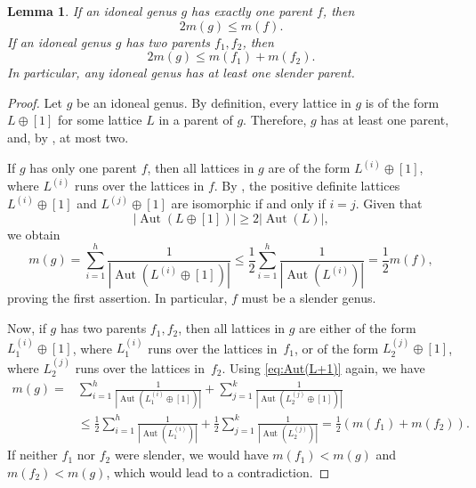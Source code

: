 \documentclass[a4paper]{amsart}
\theoremstyle{definition}
\theoremstyle{plain}
\newtheorem{lemma}[definition]{Lemma}
\DeclareMathOperator{\Aut}{Aut}
\begin{document}
\begin{lemma} \label{lem:slender.parent}
	If an idoneal genus \(g\) has exactly one parent \(f\), then
	\[
		2 m(g) \leq m(f).
	\]
	If an idoneal genus \(g\) has two parents \(f_1,f_2\), then
	\[
		2 m(g) \leq m(f_1) + m(f_2).
	\]	
	In particular, any idoneal genus has at least one slender parent.
\end{lemma}
\begin{proof}
    Let \(g\) be an idoneal genus. By definition, every lattice in \(g\) is of the form \(L \oplus [1]\) for some lattice \(L\) in a parent of \(g\). Therefore, \(g\) has at least one parent, and, by , at most two.
    
    If \(g\) has only one parent \(f\), then all lattices in \(g\) are of the form \(L^{(i)} \oplus [1]\), where \(L^{(i)}\) runs over the lattices in \(f\). 
    By \cite[Satz~27.5]{kneser}, the positive definite lattices \(L^{(i)} \oplus [1]\) and \(L^{(j)} \oplus [1]\) are isomorphic if and only if \(i = j\). 
    Given that
    \begin{equation} \label{eq:Aut(L+1)}
    	|{\Aut(L \oplus [1])}| \geq 2 |{\Aut(L)}|,
    \end{equation}
    we obtain
    \[
        m(g) = \sum_{i = 1}^h \frac{1}{|{\Aut(L^{(i)} \oplus [1])}|} \leq \frac 12 \sum_{i = 1}^h \frac{1}{|{\Aut(L^{(i)})}|} = \frac 12 m(f),
    \]
    proving the first assertion. In particular, \(f\) must be a slender genus.
    
    Now, if \(g\) has two parents \(f_1,f_2\), then all lattices in \(g\) are either of the form \(L_1^{(i)} \oplus [1]\), where \(L_1^{(i)}\) runs over the lattices in~\(f_1\), or of the form \(L_2^{(j)} \oplus [1]\), where \(L_2^{(j)}\) runs over the lattices in~\(f_2\).
    Using \eqref{eq:Aut(L+1)} again, we have
    \begin{align*}
        m(g) = & \sum_{i = 1}^h \frac{1}{|{\Aut(L_1^{(i)} \oplus [1])}|} + \sum_{j = 1}^k \frac{1}{|{\Aut(L_2^{(j)} \oplus [1])}|} \\ 
        & \leq \frac 12 \sum_{i = 1}^h \frac{1}{|{\Aut(L_1^{(i)})}|} + \frac 12 \sum_{j = 1}^k \frac{1}{|{\Aut(L_2^{(j)})}|} = \frac 12 (m(f_1) + m(f_2)). 
    \end{align*} 
    If neither \(f_1\) nor \(f_2\) were slender, we would have \(m(f_1) < m(g)\) and \(m(f_2) < m(g)\), which would lead to a contradiction.
\end{proof}
\end{document}
